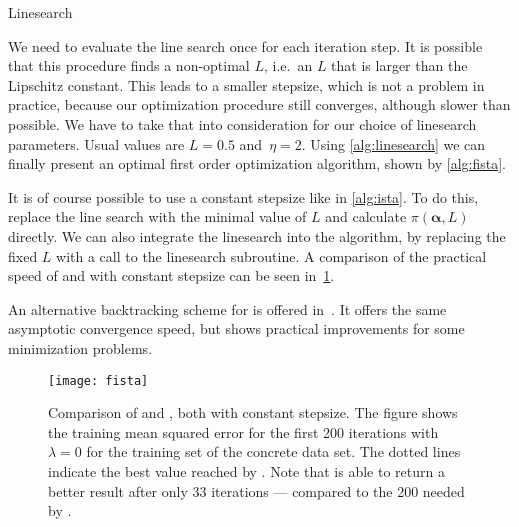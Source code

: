 \begin{algorithm}[h!]
 \caption{Linesearch~\cite{fista}}\label{alg:linesearch}
 \begin{algorithmic}[1]
  \Statex
    \Do
    \State {} 
  \EndFunction
 \end{algorithmic}
\end{algorithm}

We need to evaluate the line search once for each iteration step.
It is possible that this procedure finds a non-optimal \(L\), i.e.~an \(L\) that
is larger than the Lipschitz constant.
This leads to a smaller stepsize, which is not a problem in practice, because
our optimization procedure still converges, although slower than possible.
We have to take that into consideration for our choice of linesearch parameters.
Usual values are \(L = 0.5\) and~\(\eta = 2\).
Using \cref{alg:linesearch} we can finally present an optimal first order optimization algorithm, shown by \cref{alg:fista}.

It is of course possible to use a constant stepsize like in \cref{alg:ista}.
To do this, replace the line search with the minimal value of \(L\) and
calculate \(\pi(\bm{\alpha}, L)\) directly.
We can also integrate the linesearch into the \ista algorithm, by replacing the
fixed \(L\) with a call to the linesearch subroutine.
A comparison of the practical speed of \ista and \fista with constant stepsize can be seen in~\cref{fig:fista-convergence}.

An alternative backtracking scheme for \fista is offered in~\cite{fista-backtracking}.
It offers the same asymptotic convergence speed, but shows practical improvements for some minimization problems.

\begin{figure}[bt]
  \texttt{[image: fista]}
  \caption[Comparison of \fista and \ista]{Comparison of \fista and \ista, both with constant stepsize.
    The figure shows the training mean squared error for the first 200
    iterations with \(\lambda = 0\) for the training set of the concrete
    data set.
    The dotted lines indicate the best value reached by \ista.
    Note that \fista is able to return a better result after only 33
    iterations ---
    compared to the 200 needed by \ista.
  }\label{fig:fista-convergence}
\end{figure}

